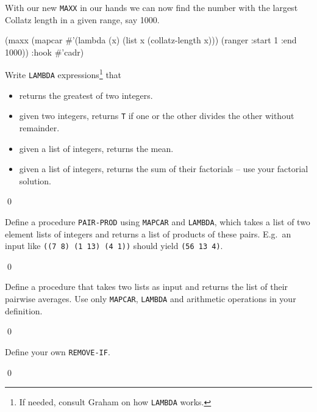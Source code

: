 \documentclass[a4paper,11pt]{article}
\begin{document}
\begin{uenum}
\begin{uenumi}
\item With our new \Verb+MAXX+ in our hands we can now find the number with the largest Collatz length in a given range, say 1000.

\begin{lispcode}
(maxx (mapcar #'(lambda (x) 
				  (list x (collatz-length x))) 
			  (ranger :start 1 :end 1000)) :hook #'cadr)
\end{lispcode}

\end{uenumi}
\end{uenum}

\noindent \hrulefill

\begin{uexercise}
Write \Verb+LAMBDA+ expressions\footnote{If needed, consult Graham on how \Verb+LAMBDA+ works.} that

\begin{itemize}
\item returns the greatest of two integers.
\item given two integers,  returns \Verb+T+ if one or the other divides the other without remainder.
\item given a list of integers, returns the mean.
\item given a list of integers, returns the sum of their factorials -- use your factorial solution.
\end{itemize}

\qed
\end{uexercise}

\begin{uexercise}
 Define a procedure \Verb+PAIR-PROD+ using \Verb+MAPCAR+ and \Verb+LAMBDA+, which takes a list of two element lists of integers and returns a list of products of these pairs. E.g.\  an input like \Verb+((7 8) (1 13) (4 1))+ should yield \Verb+(56 13 4)+.

\qed
\end{uexercise}

\begin{uexercise}
Define a procedure that takes two lists as input and returns the list of their pairwise averages. Use only \Verb+MAPCAR+, \Verb+LAMBDA+ and arithmetic operations in your definition.

\qed
\end{uexercise}

\begin{uexercise}
Define your own \Verb+REMOVE-IF+.

\qed
\end{uexercise}
\end{document}
